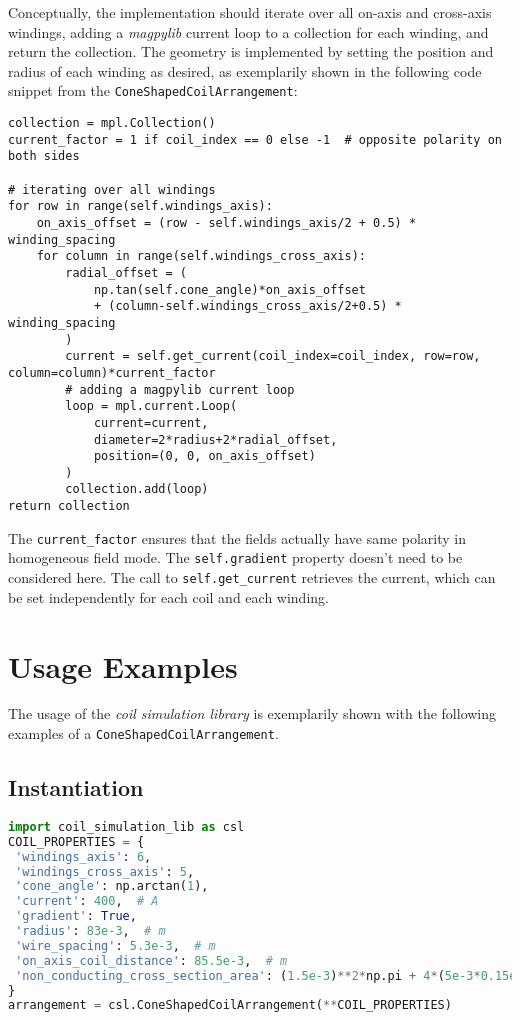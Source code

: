 Conceptually, the implementation should iterate over all on-axis and cross-axis windings, adding a \textit{magpylib} current loop to a collection for each winding, and return the collection. The geometry is implemented by setting the position and radius of each winding as desired, as exemplarily shown in the following code snippet from the \texttt{ConeShapedCoilArrangement}:
\begin{lstlisting}
collection = mpl.Collection()
current_factor = 1 if coil_index == 0 else -1  # opposite polarity on both sides

# iterating over all windings
for row in range(self.windings_axis):
    on_axis_offset = (row - self.windings_axis/2 + 0.5) * winding_spacing
    for column in range(self.windings_cross_axis):
        radial_offset = (
            np.tan(self.cone_angle)*on_axis_offset
            + (column-self.windings_cross_axis/2+0.5) * winding_spacing
        )
        current = self.get_current(coil_index=coil_index, row=row, column=column)*current_factor
        # adding a magpylib current loop
        loop = mpl.current.Loop(
            current=current,
            diameter=2*radius+2*radial_offset,
            position=(0, 0, on_axis_offset)
        )
        collection.add(loop)
return collection
\end{lstlisting}
The \texttt{current\_factor} ensures that the fields actually have same polarity in homogeneous field mode. The \texttt{self.gradient} property doesn't need to be considered here. The call to \texttt{self.get\_current} retrieves the current, which can be set independently for each coil and each winding.

\section*{Usage Examples}
The usage of the \textit{coil simulation library} is exemplarily shown with the following examples of a \texttt{ConeShapedCoilArrangement}.

\subsection*{Instantiation}
\begin{lstlisting}[language=Python]
import coil_simulation_lib as csl
COIL_PROPERTIES = {
 'windings_axis': 6,
 'windings_cross_axis': 5,
 'cone_angle': np.arctan(1),
 'current': 400,  # A
 'gradient': True,
 'radius': 83e-3,  # m
 'wire_spacing': 5.3e-3,  # m
 'on_axis_coil_distance': 85.5e-3,  # m
 'non_conducting_cross_section_area': (1.5e-3)**2*np.pi + 4*(5e-3*0.15e-3)  # m^2
}
arrangement = csl.ConeShapedCoilArrangement(**COIL_PROPERTIES)
\end{lstlisting}

